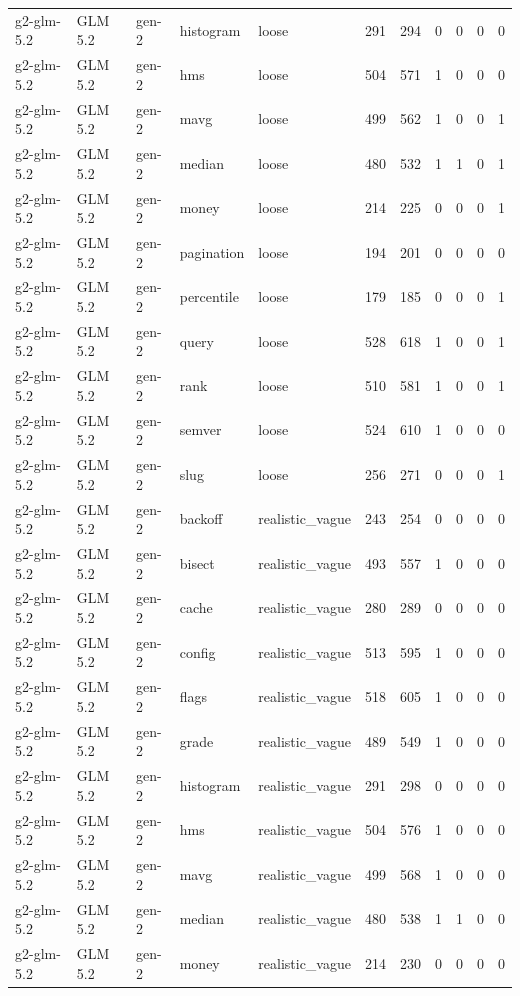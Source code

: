 \begin{tabular}{lllllllllll}
g2-glm-5.2 & GLM 5.2 & gen-2 & histogram & loose & 291 & 294 & 0 & 0 & 0 & 0 \\
g2-glm-5.2 & GLM 5.2 & gen-2 & hms & loose & 504 & 571 & 1 & 0 & 0 & 0 \\
g2-glm-5.2 & GLM 5.2 & gen-2 & mavg & loose & 499 & 562 & 1 & 0 & 0 & 1 \\
g2-glm-5.2 & GLM 5.2 & gen-2 & median & loose & 480 & 532 & 1 & 1 & 0 & 1 \\
g2-glm-5.2 & GLM 5.2 & gen-2 & money & loose & 214 & 225 & 0 & 0 & 0 & 1 \\
g2-glm-5.2 & GLM 5.2 & gen-2 & pagination & loose & 194 & 201 & 0 & 0 & 0 & 0 \\
g2-glm-5.2 & GLM 5.2 & gen-2 & percentile & loose & 179 & 185 & 0 & 0 & 0 & 1 \\
g2-glm-5.2 & GLM 5.2 & gen-2 & query & loose & 528 & 618 & 1 & 0 & 0 & 1 \\
g2-glm-5.2 & GLM 5.2 & gen-2 & rank & loose & 510 & 581 & 1 & 0 & 0 & 1 \\
g2-glm-5.2 & GLM 5.2 & gen-2 & semver & loose & 524 & 610 & 1 & 0 & 0 & 0 \\
g2-glm-5.2 & GLM 5.2 & gen-2 & slug & loose & 256 & 271 & 0 & 0 & 0 & 1 \\
g2-glm-5.2 & GLM 5.2 & gen-2 & backoff & realistic\_vague & 243 & 254 & 0 & 0 & 0 & 0 \\
g2-glm-5.2 & GLM 5.2 & gen-2 & bisect & realistic\_vague & 493 & 557 & 1 & 0 & 0 & 0 \\
g2-glm-5.2 & GLM 5.2 & gen-2 & cache & realistic\_vague & 280 & 289 & 0 & 0 & 0 & 0 \\
g2-glm-5.2 & GLM 5.2 & gen-2 & config & realistic\_vague & 513 & 595 & 1 & 0 & 0 & 0 \\
g2-glm-5.2 & GLM 5.2 & gen-2 & flags & realistic\_vague & 518 & 605 & 1 & 0 & 0 & 0 \\
g2-glm-5.2 & GLM 5.2 & gen-2 & grade & realistic\_vague & 489 & 549 & 1 & 0 & 0 & 0 \\
g2-glm-5.2 & GLM 5.2 & gen-2 & histogram & realistic\_vague & 291 & 298 & 0 & 0 & 0 & 0 \\
g2-glm-5.2 & GLM 5.2 & gen-2 & hms & realistic\_vague & 504 & 576 & 1 & 0 & 0 & 0 \\
g2-glm-5.2 & GLM 5.2 & gen-2 & mavg & realistic\_vague & 499 & 568 & 1 & 0 & 0 & 0 \\
g2-glm-5.2 & GLM 5.2 & gen-2 & median & realistic\_vague & 480 & 538 & 1 & 1 & 0 & 0 \\
g2-glm-5.2 & GLM 5.2 & gen-2 & money & realistic\_vague & 214 & 230 & 0 & 0 & 0 & 0 \\

\end{tabular}
